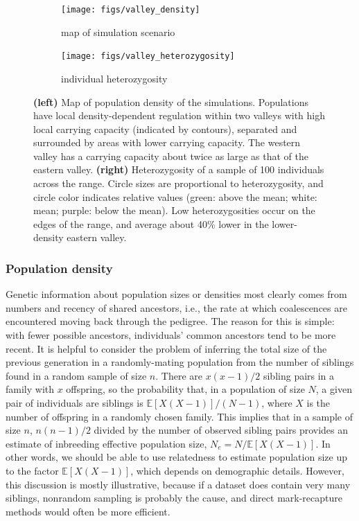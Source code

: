 \documentclass{ar-1col}
\newcommand{\E}{\mathbb{E}}
\begin{document}
\begin{figure}[h]
    \centering
    \begin{subfigure}{0.45\textwidth}
        \centering
        \texttt{[image: figs/valley\_density]}
        \caption{map of simulation scenario}
        \label{valley_map}
    \end{subfigure}
    \begin{subfigure}{0.45\textwidth}
        \centering
        \texttt{[image: figs/valley\_heterozygosity]}
        \caption{individual heterozygosity}
        \label{valley_het}
    \end{subfigure}
        \caption{
            \textbf{(left)} Map of population density of the simulations.
            Populations have local density-dependent regulation
            within two valleys with high local carrying capacity (indicated by contours),
            separated and surrounded by areas with lower carrying capacity.
            The western valley has a carrying capacity about twice as large as that of the eastern valley.
            \textbf{(right)} Heterozygosity of a sample of 100 individuals across the range.
            Circle sizes are proportional to heterozygosity,
            and circle color indicates relative values
            (green: above the mean; white: mean; purple: below the mean).
            Low heterozygosities occur on the edges of the range,
            and average about 40\% lower in the lower-density eastern valley.
		}
        \label{pop_density}
\end{figure}


\subsubsection{Population density}

Genetic information about population sizes or densities most clearly
comes from numbers and recency of shared ancestors, 
i.e., the rate at which coalescences are encountered moving back through the pedigree.
The reason for this is simple:
with fewer possible ancestors,
individuals' common ancestors tend to be more recent.
It is helpful to consider 
the problem of inferring the total size of the previous generation
in a randomly-mating population
from the number of siblings found in a random sample of size $n$.
There are $x (x-1) / 2$ sibling pairs in a family with $x$ offspring,
so the probability that, 
in a population of size $N$, 
a given pair of individuals are siblings
is $\E[X (X-1)] / (N-1)$, where $X$ is the number of offspring in a randomly chosen family.
This implies that in a sample of size $n$,
$n(n-1)/2$ divided by the number of observed sibling pairs 
provides an estimate of inbreeding effective population size, $N_e = N/\E[X(X-1)]$.
In other words, we should be able to use relatedness to estimate population size
up to the factor $\E[X(X-1)]$, which depends on demographic details.
However, this discussion is mostly illustrative, because
if a dataset does contain very many siblings,
nonrandom sampling is probably the cause,
and direct mark-recapture methods would often be more efficient.
\end{document}
